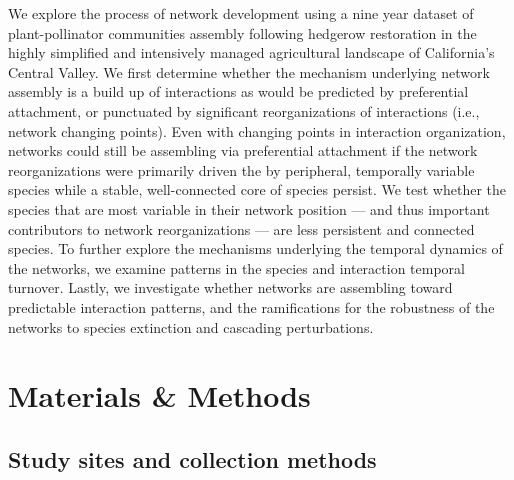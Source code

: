 \documentclass[12pt]{article}
\begin{document}
We explore the process of network development using a nine year
dataset of plant-pollinator communities assembly following hedgerow
restoration in the highly simplified and intensively managed
agricultural landscape of California's Central Valley.  We first
determine whether the mechanism underlying network assembly is a build
up of interactions as would be predicted by preferential attachment,
or punctuated by significant reorganizations of interactions (i.e.,
network changing points). Even with changing points in interaction
organization, networks could still be assembling via preferential
attachment if the network reorganizations were primarily driven the by
peripheral, temporally variable species while a stable, well-connected
core of species persist. We test whether the species that are most
variable in their network position --- and thus important contributors
to network reorganizations --- are less persistent and connected
species. To further explore the mechanisms underlying the temporal
dynamics of the networks, we examine patterns in the species and
interaction temporal turnover. Lastly, we investigate whether networks
are assembling toward predictable interaction patterns, and the
ramifications for the robustness of the networks to species extinction
and cascading perturbations.


\section*{Materials \& Methods}
\label{sec:methods}

\subsection*{Study sites and collection methods}
\label{sec:study-sites}
\end{document}
